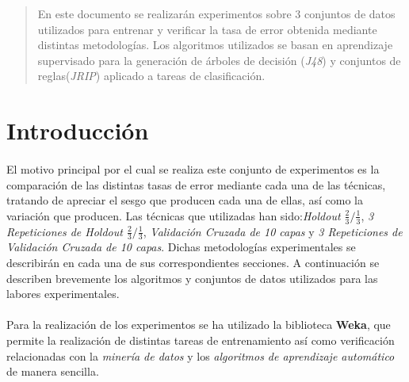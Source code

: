 \documentclass{article}
\begin{document}
	\maketitle %

	\thispagestyle{fancy} %



	\begin{abstract}
		\noindent En este documento se realizarán experimentos sobre 3 conjuntos de datos utilizados para entrenar y verificar la tasa de error obtenida mediante distintas metodologías. Los algoritmos utilizados se basan en aprendizaje supervisado para la generación de árboles de decisión (\emph{J48}) y conjuntos de reglas(\emph{JRIP}) aplicado a tareas de clasificación.
	\end{abstract}



	\section{Introducción}
	\label{sec:introducción}

		\paragraph{}
		El motivo principal por el cual se realiza este conjunto de experimentos es la comparación de las distintas tasas de error mediante cada una de las técnicas, tratando de apreciar el sesgo que producen cada una de ellas, así como la variación que producen. Las técnicas que utilizadas han sido:\emph{Holdout $\tfrac{2}{3}/\tfrac{1}{3}$}, \emph{3 Repeticiones de Holdout $\tfrac{2}{3}/\tfrac{1}{3}$}, \emph{Validación Cruzada de 10 capas} y \emph{3 Repeticiones de Validación Cruzada de 10 capas}. Dichas metodologías experimentales se describirán en cada una de sus correspondientes secciones. A continuación se describen brevemente los algoritmos y conjuntos de datos utilizados para las labores experimentales.

		\paragraph{}
		Para la realización de los experimentos se ha utilizado la biblioteca \textbf{Weka}\cite{tool:weka}, que permite la realización de distintas tareas de entrenamiento así como verificación relacionadas con la \emph{minería de datos} y los \emph{algoritmos de aprendizaje automático} de manera sencilla.
\end{document}
